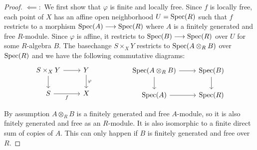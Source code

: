 \begin{proof}
	\par $\impliedby:$
	We first show that $\varphi$ is finite and locally free. Since $f$ is locally free, each point of $X$ has an affine open neighborhood $U = \operatorname{Spec}(R)$ such that $f$ restricts to a morphism $\operatorname{Spec}(A) \longrightarrow \operatorname{Spec}(R)$ where $A$ is a finitely generated and free $R$-module. Since $\varphi$ is affine, it restricts to $\operatorname{Spec}(B) \longrightarrow \operatorname{Spec}(R)$ over $U$ for some $R$-algebra $B$. The basechange $S \times_X Y$ restricts to $\operatorname{Spec}(A \otimes_R B)$ over $\operatorname{Spec}(R)$ and we have the following commutative diagrams:
	\[
		\centering
		\begin{minipage}{0.4\textwidth}
			\begin{tikzcd}
				{S \times_X Y} & Y \\
				S & X
				\arrow["\varphi", from=1-2, to=2-2]
				\arrow["f"', from=2-1, to=2-2]
				\arrow[from=1-1, to=1-2]
				\arrow[from=1-1, to=2-1]
			\end{tikzcd}
		\end{minipage}
		\begin{minipage}{0.4\textwidth}
			\begin{tikzcd}
				{\Spec(A \otimes_RB)} & {\Spec(B)} \\
				{\Spec(A)} & {\Spec(R)}
				\arrow[from=1-1, to=2-1]
				\arrow[from=1-1, to=1-2]
				\arrow[from=2-1, to=2-2]
				\arrow[from=1-2, to=2-2]
			\end{tikzcd}
		\end{minipage}
	\]

	By assumption $A \otimes_R B$ is a finitely generated and free $A$-module, so it is also fnitely generated and free as an $R$-module. It is also isomorphic to a finite direct sum of copies of $A$. This can only happen if $B$ is finitely generated and free over $R$. \par


\end{proof}
